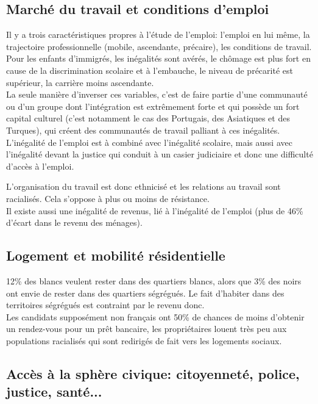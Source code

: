 \documentclass[12pt, a4paper, openany]{book}
\begin{document}
\subsection{Marché du travail et conditions d'emploi}

Il y a trois caractéristiques propres à l'étude de l'emploi: l'emploi en lui même, la trajectoire professionnelle (mobile, ascendante, précaire), les conditions de travail. \\
Pour les enfants d'immigrés, les inégalités sont avérés, le chômage est plus fort en cause de la discrimination scolaire et à l'embauche, le niveau de précarité est supérieur, la carrière moins ascendante. \\
La seule manière d'inverser ces variables, c'est de faire partie d'une communauté ou d'un groupe dont l'intégration est extrêmement forte et qui possède un fort capital culturel (c'est notamment le cas des Portugais, des Asiatiques et des Turques), qui créent des communautés de travail palliant à ces inégalités. \\
L'inégalité de l'emploi est à combiné avec l'inégalité scolaire, mais aussi avec l'inégalité devant la justice qui conduit à un casier judiciaire et donc une difficulté d'accès à l'emploi.


L'organisation du travail est donc ethnicisé et les relations au travail sont racialisés. Cela s'oppose à plus ou moins de résistance. \\
Il existe aussi une inégalité de revenus, lié à l'inégalité de l'emploi (plus de 46\% d'écart dans le revenu des ménages). \\


\subsection{Logement et mobilité résidentielle}

12\% des blancs veulent rester dans des quartiers blancs, alors que 3\% des noirs ont envie de rester dans des quartiers ségrégués. Le fait d'habiter dans des territoires ségrégués est contraint par le revenu donc. \\
Les candidats supposément non français ont 50\% de chances de moins d'obtenir un rendez-vous pour un prêt bancaire, les propriétaires louent très peu aux populations racialisés qui sont redirigés de fait vers les logements sociaux. 

\subsection{Accès à la sphère civique: citoyenneté, police, justice, santé...}
\end{document}
